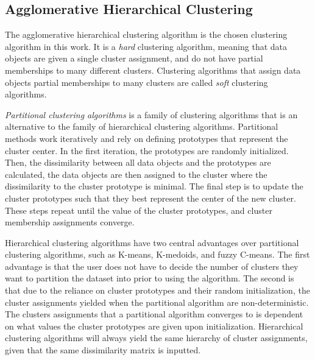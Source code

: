 \subsection{Agglomerative Hierarchical Clustering} \label{sec:ahc}

The agglomerative hierarchical clustering algorithm is the chosen clustering algorithm in this work. It is a \textit{hard} clustering algorithm, meaning that data objects are given a single cluster assignment, and do not have partial memberships to many different clusters. Clustering algorithms that assign data objects partial memberships to many clusters are called \textit{soft} clustering algorithms. \bigskip

\textit{Partitional clustering algorithms} is a family of clustering algorithms that is an alternative to the family of hierarchical clustering algorithms. Partitional methods work iteratively and rely on defining prototypes that represent the cluster center. In the first iteration, the prototypes are randomly initialized. Then, the dissimilarity between all data objects and the prototypes are calculated, the data objects are then assigned to the cluster where the dissimilarity to the cluster prototype is minimal. The final step is to update the cluster prototypes such that they best represent the center of the new cluster. These steps repeat until the value of the cluster prototypes, and cluster membership assignments converge. \bigskip

Hierarchical clustering algorithms have two central advantages over partitional clustering algorithms, such as K-means, K-medoids, and fuzzy C-means. The first advantage is that the user does not have to decide the number of clusters they want to partition the dataset into prior to using the algorithm. The second is that due to the reliance on cluster prototypes and their random initialization, the cluster assignments yielded when the partitional algorithm are non-deterministic. The clusters assignments that a partitional algorithm converges to is dependent on what values the cluster prototypes are given upon initialization. Hierarchical clustering algorithms will always yield the same hierarchy of cluster assignments, given that the same dissimilarity matrix is inputted. \bigskip

